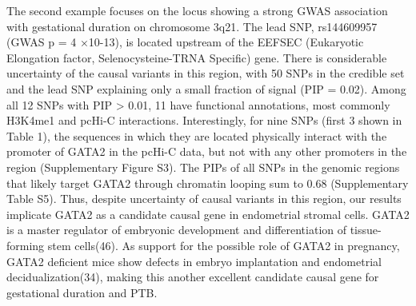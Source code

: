 The second example focuses on the locus showing a strong GWAS association with gestational duration on chromosome 3q21. The lead SNP, rs144609957 (GWAS p = 4 ×10-13), is located upstream of the EEFSEC (Eukaryotic Elongation factor, Selenocysteine-TRNA Specific) gene. There is considerable uncertainty of the causal variants in this region, with 50 SNPs in the credible set and the lead SNP explaining only a small fraction of signal (PIP = 0.02). Among all 12 SNPs with PIP > 0.01, 11 have functional annotations, most commonly H3K4me1 and pcHi-C interactions. Interestingly, for nine SNPs (first 3 shown in Table 1), the sequences in which they are located physically interact with the promoter of GATA2 in the pcHi-C data, but not with any other promoters in the region (Supplementary Figure S3). The PIPs of all SNPs in the genomic regions that likely target GATA2 through chromatin looping sum to 0.68 (Supplementary Table S5). Thus, despite uncertainty of causal variants in this region, our results implicate GATA2 as a candidate causal gene in endometrial stromal cells. GATA2 is a master regulator of embryonic development and differentiation of tissue-forming stem cells(46). As support for the possible role of GATA2 in pregnancy, GATA2 deficient mice show defects in embryo implantation and endometrial decidualization(34), making this another excellent candidate causal gene for gestational duration and PTB. 


